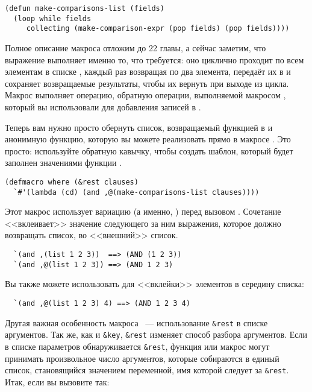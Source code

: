 \begin{lstlisting}
(defun make-comparisons-list (fields)
  (loop while fields
     collecting (make-comparison-expr (pop fields) (pop fields))))
\end{lstlisting}

Полное описание макроса  отложим до 22 главы, а сейчас заметим, что выражение
 выполняет именно то, что требуется: оно циклично проходит по всем элементам в
списке , каждый раз возвращая по два элемента, передаёт их в
 и сохраняет возвращаемые результаты, чтобы их вернуть при
выходе из цикла. Макрос  выполняет операцию, обратную операции, выполняемой макросом
, который вы использовали для добавления записей в .

Теперь вам нужно просто обернуть список, возвращаемый функцией 
в  и анонимную функцию, которую вы можете реализовать прямо в макросе
. Это просто: используйте обратную кавычку, чтобы создать шаблон, который
будет заполнен значениями функции .

\begin{lstlisting}
(defmacro where (&rest clauses)
  `#'(lambda (cd) (and ,@(make-comparisons-list clauses))))
\end{lstlisting}

Этот макрос использует вариацию \code{,} (а именно, ) перед вызовом
. Сочетание  <<вклеивает>> значение следующего за ним
выражения, которое должно возвращать список, во <<внешний>> список.

\begin{verbatim}
  `(and ,(list 1 2 3))  ==> (AND (1 2 3))
  `(and ,@(list 1 2 3)) ==> (AND 1 2 3)
\end{verbatim}

Вы также можете использовать  для <<вклейки>> элементов в середину списка:

\begin{verbatim}
  `(and ,@(list 1 2 3) 4) ==> (AND 1 2 3 4)
\end{verbatim}

Другая важная особенность макроса ~--- использование \lstinline{&rest} в списке
аргументов. Так же, как и \lstinline!&key!, \lstinline{&rest} изменяет способ разбора
аргументов. Если в списке параметров обнаруживается \lstinline{&rest}, функция или макрос могут
принимать произвольное число аргументов, которые собираются в единый список, становящийся
значением переменной, имя которой следует за \lstinline{&rest}. Итак, если вы вызовите
 так:

